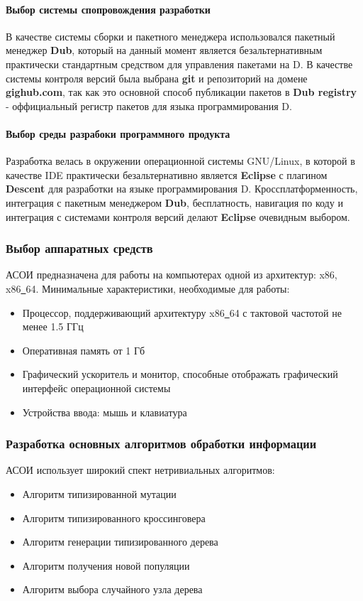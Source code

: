\documentclass[russian,utf8,emptystyle]{eskdtext}
\begin{document}
\begin{spacing}{1.5}
\paragraph{Выбор системы спопровождения разработки}
В качестве системы сборки и пакетного менеджера использовался пакетный менеджер \textbf{Dub}, который на данный момент является безальтернативным практически стандартным средством для управления пакетами на D. В качестве системы контроля версий была выбрана \textbf{git} и репозиторий на домене \textbf{gighub.com}, так как это основной способ публикации пакетов в \textbf{Dub registry} - оффициальный регистр пакетов для языка программирования D.

\paragraph{Выбор среды разрабоки программного продукта}
Разработка велась в окружении операционной системы GNU/Linux, в которой в качестве IDE практически безальтернативно является \textbf{Eclipse} с плагином \textbf{Descent} для разработки на языке программирования D. Кроссплатформенность, интеграция с пакетным менеджером \textbf{Dub}, бесплатность, навигация по коду и интеграция с системами контроля версий делают \textbf{Eclipse} очевидным выбором. 

\subsubsection{Выбор аппаратных средств}
АСОИ предназначена для работы на компьютерах одной из архитектур: x86, x86\underline{~}64. Минимальные характеристики, необходимые для работы:
\begin{itemize}
\item Процессор, поддерживающий архитектуру x86\underline{~}64 с тактовой частотой не менее 1.5 ГГц
\item Оперативная память от 1 Гб
\item Графический ускоритель и монитор, способные отображать графический интерфейс операционной системы
\item Устройства ввода: мышь и клавиатура
\end{itemize}

\subsubsection{Разработка основных алгоритмов обработки информации}
АСОИ использует широкий спект нетривиальных алгоритмов:
\begin{itemize}
\item Алгоритм типизированной мутации
\item Алгоритм типизированного кроссинговера
\item Алгоритм генерации типизированного дерева
\item Алгоритм получения новой популяции
\item Алгоритм выбора случайного узла дерева
\end{itemize}


\end{spacing}
\end{document}
